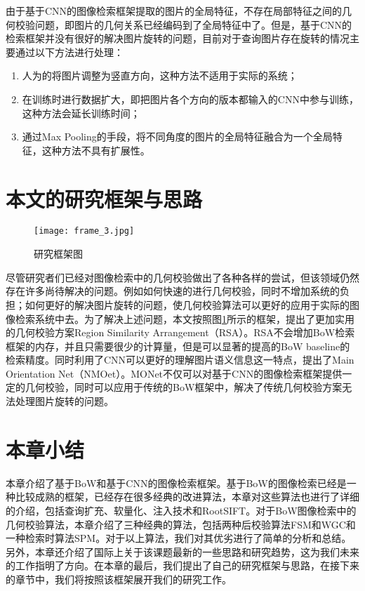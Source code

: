 由于基于CNN的图像检索框架提取的图片的全局特征，不存在局部特征之间的几何校验问题，即图片的几何关系已经编码到了全局特征中了。但是，基于CNN的检索框架并没有很好的解决图片旋转的问题，目前对于查询图片存在旋转的情况主要通过以下方法进行处理：
\begin{enumerate}
	\item 人为的将图片调整为竖直方向\cite{babenko2014neural}，这种方法不适用于实际的系统；
	\item 在训练时进行数据扩大，即把图片各个方向的版本都输入的CNN中参与训练\cite{babenko2014neural}，这种方法会延长训练时间；
	\item 通过Max Pooling的手段，将不同角度的图片的全局特征融合为一个全局特征\cite{chandrasekhar2015practical}，这种方法不具有扩展性。
\end{enumerate}


\section{本文的研究框架与思路}
\begin{figure}[h]
	\centering
	\texttt{[image: frame\_3.jpg]}
	\caption{研究框架图}\label{fig:frame}
\end{figure}
尽管研究者们已经对图像检索中的几何校验做出了各种各样的尝试，但该领域仍然存在许多尚待解决的问题。例如如何快速的进行几何校验，同时不增加系统的负担；如何更好的解决图片旋转的问题，使几何校验算法可以更好的应用于实际的图像检索系统中去。为了解决上述问题，本文按照图\ref{fig:frame}所示的框架，提出了更加实用的几何校验方案Region Similarity Arrangement（RSA）。RSA不会增加BoW检索框架的内存，并且只需要很少的计算量，但是可以显著的提高的BoW baseline的检索精度。同时利用了CNN可以更好的理解图片语义信息这一特点，提出了Main Orientation Net（NMOet）。MONet不仅可以对基于CNN的图像检索框架提供一定的几何校验，同时可以应用于传统的BoW框架中，解决了传统几何校验方案无法处理图片旋转的问题。

\section{本章小结}
本章介绍了基于BoW和基于CNN的图像检索框架。基于BoW的图像检索已经是一种比较成熟的框架，已经存在很多经典的改进算法，本章对这些算法也进行了详细的介绍，包括查询扩充、软量化、注入技术和RootSIFT。对于BoW图像检索中的几何校验算法，本章介绍了三种经典的算法，包括两种后校验算法FSM和WGC和一种检索时算法SPM。对于以上算法，我们对其优劣进行了简单的分析和总结。另外，本章还介绍了国际上关于该课题最新的一些思路和研究趋势，这为我们未来的工作指明了方向。在本章的最后，我们提出了自己的研究框架与思路，在接下来的章节中，我们将按照该框架展开我们的研究工作。

